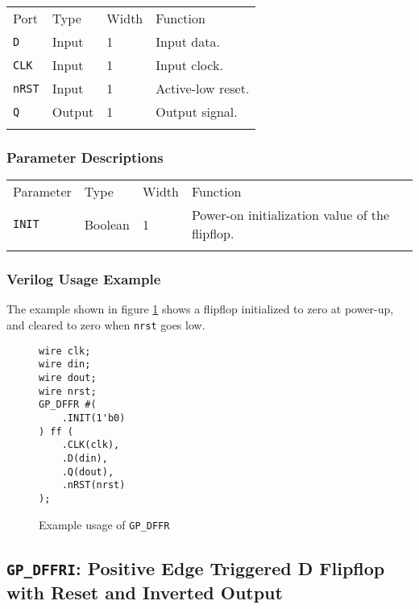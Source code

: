 \documentclass[11pt]{article}
\newcommand{\tokenstyle}[1]{\texttt{#1}}
\newcommand{\wirestyle}[1]{\texttt{#1}}
\newcommand{\whenstyle}[1]{{\fontseries{sb}\selectfont#1}}
\newcommand{\thinhline}{\Xhline{1\arrayrulewidth}}
\newcommand{\thickhline}{\Xhline{2.5\arrayrulewidth}}
\begin{document}
\begin{tabularx}{\textwidth}{lllX}
\thinhline
\whenstyle{Port} & \whenstyle{Type} & \whenstyle{Width} & \whenstyle{Function} \\
\thickhline
\tokenstyle{D} & Input & 1 & Input data. \\
\thinhline
\tokenstyle{CLK} & Input & 1 & Input clock. \\
\thinhline
\tokenstyle{nRST} & Input & 1 & Active-low reset. \\
\thinhline
\tokenstyle{Q} & Output & 1 & Output signal. \\
\thinhline
\end{tabularx}

\subsubsection{Parameter Descriptions}

\begin{tabularx}{\textwidth}{lllX}
\thinhline
\whenstyle{Parameter} & \whenstyle{Type} & \whenstyle{Width} & \whenstyle{Function} \\
\thickhline
\tokenstyle{INIT} & Boolean & 1 & Power-on initialization value of the flipflop. \\
\thinhline
\end{tabularx}

\subsubsection{Verilog Usage Example}

The example shown in figure \ref{gp-dffr-example} shows a flipflop initialized to zero at power-up, and cleared to zero
when \wirestyle{nrst} goes low.

\begin{figure}[h]
\begin{lstlisting}
wire clk;
wire din;
wire dout;
wire nrst;
GP_DFFR #(
	.INIT(1'b0)
) ff (
	.CLK(clk),
	.D(din),
	.Q(dout),
	.nRST(nrst)
);
\end{lstlisting}
\caption{Example usage of \tokenstyle{GP\_DFFR}}
\label{gp-dffr-example}
\end{figure}


\pagebreak
\subsection{\tokenstyle{GP\_DFFRI}: Positive Edge Triggered D Flipflop with Reset and Inverted Output}
\label{gp-dffr}
\end{document}

